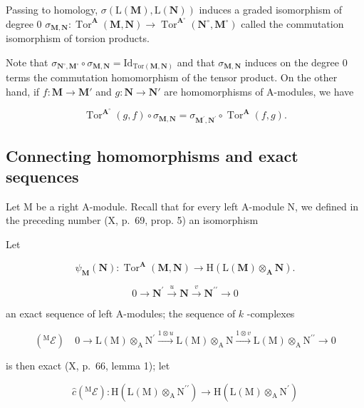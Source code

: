 Passing to homology, \(\sigma(\mathrm{L}(\mathbf{M}),\mathrm{L}(\mathbf{N}))\) induces a graded isomorphism of degree 0 \(\sigma_{\mathbf{M},\mathbf{N}}:\operatorname{Tor}^{\mathbf{A}}(\mathbf{M},\mathbf{N})\to\operatorname{Tor}^{\mathbf{A}^{\circ}}(\mathbf{N}^{\circ},\mathbf{M}^{\circ})\) called the commutation isomorphism of torsion products.

Note that \(\sigma_{\mathbf{N}^{\circ},\mathbf{M}^{\circ}}\circ\sigma_{\mathbf{M},\mathbf{N}}=\mathrm{Id}_{\mathrm{Tor}\left(\mathbf{M},\mathbf{N}\right)}\) and that \(\sigma_{\mathbf{M},\mathbf{N}}\) induces on the degree 0 terms the commutation homomorphism of the tensor product. On the other hand, if \(f:\mathbf{M}\to\mathbf{M}'\) and \(g:\mathbf{N}\to\mathbf{N}'\) are homomorphisms of A-modules, we have

\[
\operatorname{Tor} ^ {\mathbf {A} ^ {\circ}} (g, f) \circ \sigma_ {\mathbf {M}, \mathbf {N}} = \sigma_ {\mathbf {M} ^ {\prime}, \mathbf {N} ^ {\prime}} \circ \operatorname{Tor} ^ {\mathbf {A}} (f, g).
\]

\subsection{Connecting homomorphisms and exact sequences}

Let M be a right A-module. Recall that for every left A-module N, we defined in the preceding number (X, p.~69, prop. 5) an isomorphism

Let

\[
\psi_ {\mathbf {M}} (\mathbf {N}): \operatorname{Tor} ^ {\mathbf {A}} (\mathbf {M}, \mathbf {N}) \rightarrow \mathrm{H} (\mathrm{L} (\mathbf {M}) \otimes_ {\mathbf {A}} \mathbf {N}).\tag{ε}
\]

\[
0 \rightarrow \mathbf {N} ^ {\prime} \xrightarrow {u} \mathbf {N} \xrightarrow {v} \mathbf {N} ^ {\prime \prime} \rightarrow 0
\]

an exact sequence of left A-modules; the sequence of \(k\) -complexes

\[
\left(^ {\mathrm{M}} \mathcal {E}\right) \quad 0 \longrightarrow \mathrm{L} (\mathrm{M}) \otimes_ {\mathrm{A}} \mathrm{N} ^ {\prime} \xrightarrow {1 \otimes u} \mathrm{L} (\mathrm{M}) \otimes_ {\mathrm{A}} \mathrm{N} \xrightarrow {1 \otimes v} \mathrm{L} (\mathrm{M}) \otimes_ {\mathrm{A}} \mathrm{N} ^ {\prime \prime} \longrightarrow 0
\]

is then exact (X, p.~66, lemma 1); let

\[
\hat {c} \left(^ {\mathrm{M}} \mathcal {E}\right): \mathrm{H} (\mathrm{L} (\mathrm{M}) \otimes_ {\mathrm{A}} \mathrm{N} ^ {\prime \prime}) \rightarrow \mathrm{H} (\mathrm{L} (\mathrm{M}) \otimes_ {\mathrm{A}} \mathrm{N} ^ {\prime})
\]

